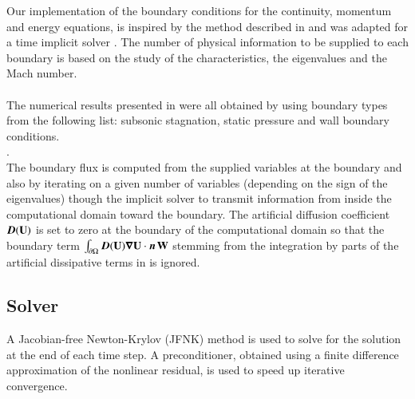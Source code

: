 \documentclass[preprint,10pt]{elsarticle}
\begin{document}
Our implementation of the boundary conditions for the continuity, momentum and energy equations, is inspired by the method described in \cite{Berry_NED2010} and was 
adapted for a time implicit solver \cite{Marco_dissertation}. The number of physical information to be supplied to each boundary is based on the study of the characteristics, the eigenvalues and the Mach number. \\
  \\
The numerical results presented in  were all obtained by using boundary types from the following list: subsonic stagnation, static pressure and wall boundary conditions.
\\ . \\
The boundary flux is computed from the supplied variables at the boundary and also by iterating on a given number of variables (depending on the sign of the eigenvalues) though the implicit 
solver to transmit information from inside the computational domain toward the boundary. 
The artificial diffusion coefficient $\boldsymbol D(\mathbf  U)$ is set to zero at the boundary of the computational 
domain so that the boundary term 
$\int_{\partial \Omega} \boldsymbol D(\mathbf  U) \boldsymbol\nabla \mathbf  U \cdot \boldsymbol n \, \mathbf W$ stemming from the 
integration by parts of the artificial dissipative terms in  is ignored.
%
\subsection{Solver} \label{sec:solver}
%
A Jacobian-free Newton-Krylov (JFNK) method is used to solve for the solution at the end of each time step. A preconditioner, 
obtained using a finite difference approximation of the nonlinear residual, is used to speed up iterative convergence.
%
\end{document}
